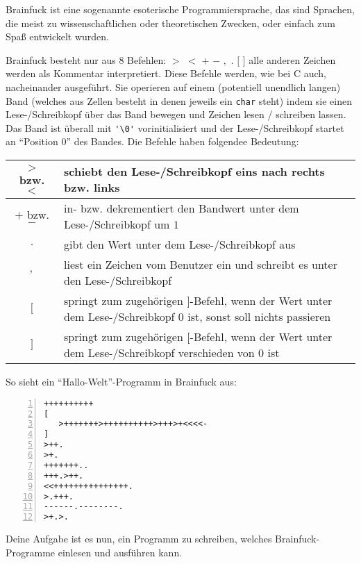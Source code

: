 \begin{aufg}
Brainfuck ist eine sogenannte esoterische Programmiersprache, das sind Sprachen, die meist zu wissenschaftlichen oder theoretischen Zwecken, oder einfach zum Spaß entwickelt wurden. 

Brainfuck besteht nur aus $8$ Befehlen: $>$ $<$ $+$ $-$ $,$ $.$ $[$ $]$ alle anderen Zeichen werden als Kommentar interpretiert. Diese Befehle werden, wie bei C auch, nacheinander ausgeführt. Sie operieren auf einem (potentiell unendlich langen) Band (welches aus Zellen besteht in denen jeweils ein \verb|char| steht) indem sie einen Lese-/Schreibkopf über das Band bewegen und Zeichen lesen / schreiben lassen. Das Band ist überall mit \verb|'\0'| vorinitialisiert und der Lese-/Schreibkopf startet an ``Position $0$'' des Bandes. Die Befehle haben folgendee Bedeutung:

\begin{tabular}{|c|p{10cm}|} \hline
$>$ bzw. $<$ & schiebt den Lese-/Schreibkopf eins nach rechts bzw. links \\\hline
$+$ bzw. $-$ & in- bzw. dekrementiert den Bandwert unter dem Lese-/Schreibkopf um $1$ \\\hline
$.$ & gibt den Wert unter dem Lese-/Schreibkopf aus \\\hline
$,$ & liest ein Zeichen vom Benutzer ein und schreibt es unter den Lese-/Schreibkopf \\\hline
$[$ & springt zum zugehörigen $]$-Befehl, wenn der Wert unter dem Lese-/Schreibkopf $0$ ist, sonst soll nichts passieren\\\hline
$]$ & springt zum zugehörigen $[$-Befehl, wenn der Wert unter dem Lese-/Schreibkopf verschieden von $0$ ist\\\hline
\end{tabular}

\newpage
So sieht ein ``Hallo-Welt''-Programm in Brainfuck aus:

\begin{codelisting}
\begin{lstlisting}[numbers=left,numberstyle=\tiny,frame=tlrb,mathescape=true]
++++++++++
[
   >+++++++>++++++++++>+++>+<<<<-
]
>++.
>+.
+++++++..
+++.>++.
<<+++++++++++++++.
>.+++.
------.--------.
>+.>.
\end{lstlisting}
\end{codelisting}
Deine Aufgabe ist es nun, ein Programm zu schreiben, welches Brainfuck-Programme einlesen und ausführen kann. 
\end{aufg}